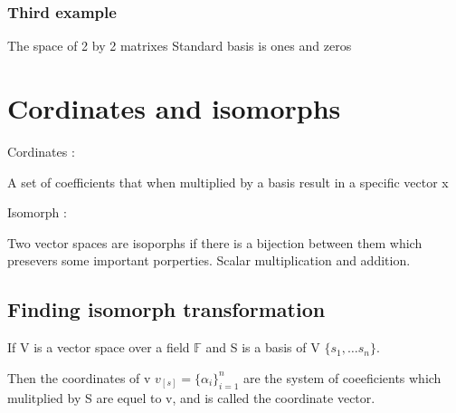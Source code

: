 \documentclass[twocolumn]{article}
\begin{document}
\hypertarget{third-example}{%
\subsubsection{Third example}\label{third-example}}

The space of 2 by 2 matrixes Standard basis is ones and zeros

\hypertarget{cordinates-and-isomorphs}{%
\section{Cordinates and isomorphs}\label{cordinates-and-isomorphs}}

Cordinates :

A set of coefficients that when multiplied by a basis result in a
specific vector x

Isomorph :

Two vector spaces are isoporphs if there is a bijection between them
which presevers some important porperties. Scalar multiplication and
addition.

\hypertarget{finding-isomorph-transformation}{%
\subsection{Finding isomorph
transformation}\label{finding-isomorph-transformation}}

If V is a vector space over a field \(\mathbb{F}\) and S is a basis of V
\(\{s_1, \dots s_n\}\).

Then the coordinates of v \(v_{[s]} = \{\alpha_i\}_{i=1}^n\) are the
system of coeeficients which mulitplied by S are equel to v, and is
called the coordinate vector.
\end{document}
